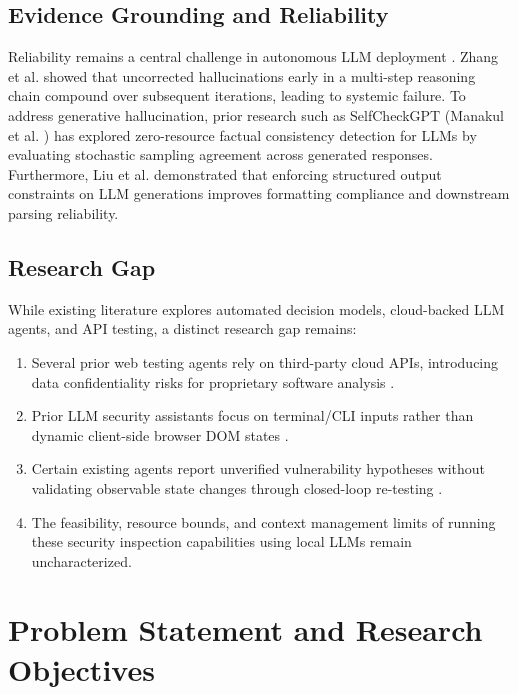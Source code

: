 \documentclass[conference]{IEEEtran}
\begin{document}
\subsection{Evidence Grounding and Reliability}
Reliability remains a central challenge in autonomous LLM deployment \cite{mayoral2023exploitflow, fang2024autonomously, happe2023getting}. Zhang et al. \cite{zhang2023snowball} showed that uncorrected hallucinations early in a multi-step reasoning chain compound over subsequent iterations, leading to systemic failure. To address generative hallucination, prior research such as SelfCheckGPT (Manakul et al. \cite{manakul2023selfcheckgpt}) has explored zero-resource factual consistency detection for LLMs by evaluating stochastic sampling agreement across generated responses. Furthermore, Liu et al. \cite{liu2024structured} demonstrated that enforcing structured output constraints on LLM generations improves formatting compliance and downstream parsing reliability.

\subsection{Research Gap}
While existing literature explores automated decision models, cloud-backed LLM agents, and API testing, a distinct research gap remains:
\begin{enumerate}
    \item Several prior web testing agents rely on third-party cloud APIs, introducing data confidentiality risks for proprietary software analysis \cite{fang2024autonomously, deng2024pentestgpt}.
    \item Prior LLM security assistants focus on terminal/CLI inputs rather than dynamic client-side browser DOM states \cite{deng2024pentestgpt, happe2023getting}.
    \item Certain existing agents report unverified vulnerability hypotheses without validating observable state changes through closed-loop re-testing \cite{fang2024autonomously, xu2024autoattacker}.
    \item The feasibility, resource bounds, and context management limits of running these security inspection capabilities using local LLMs remain uncharacterized.
\end{enumerate}

\section{Problem Statement and Research Objectives}
\end{document}
